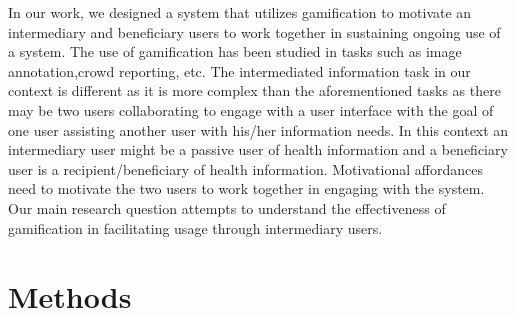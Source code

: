 \documentclass{sig-alternate}
\begin{document}
In our work, we designed a system that  utilizes gamification to motivate an intermediary and beneficiary users to work together in sustaining ongoing use of a system. The use of gamification has been studied in tasks such as image annotation\cite{mekler2013:disassembling},crowd reporting\cite{crowley2012:gamification}, etc. The intermediated information task in our context is different as it is more complex than the aforementioned tasks as there may be two users collaborating to engage with a user interface with the goal of one user assisting another user with his/her information needs. In this context an intermediary  user might be a passive user of health information and a beneficiary user is a recipient/beneficiary of health information. Motivational affordances need to motivate the two users to work together in engaging with the system.\newline
Our main research question attempts to understand the effectiveness of gamification in facilitating usage through intermediary users.
\section{Methods}
\end{document}

